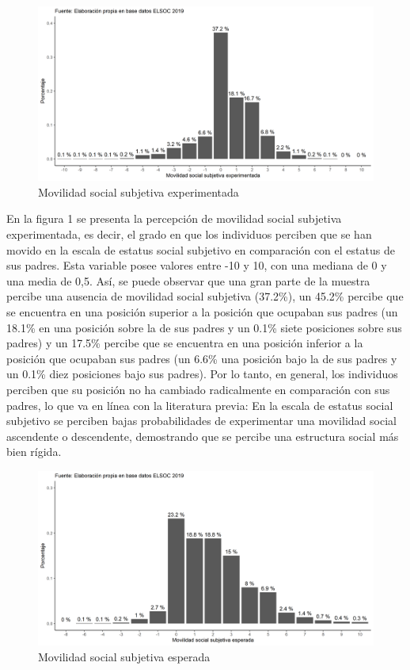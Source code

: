 \documentclass[
]{article}
\begin{document}
\begin{figure}

{\centering \includegraphics[width=0.8\linewidth,height=0.8\textheight]{output/graphs/graf1} 

}

\caption{Movilidad social subjetiva experimentada}\label{fig:unnamed-chunk-6}
\end{figure}

En la figura 1 se presenta la percepción de movilidad social subjetiva
experimentada, es decir, el grado en que los individuos perciben que se
han movido en la escala de estatus social subjetivo en comparación con
el estatus de sus padres. Esta variable posee valores entre -10 y 10,
con una mediana de 0 y una media de 0,5. Así, se puede observar que una
gran parte de la muestra percibe una ausencia de movilidad social
subjetiva (37.2\%), un 45.2\% percibe que se encuentra en una posición
superior a la posición que ocupaban sus padres (un 18.1\% en una
posición sobre la de sus padres y un 0.1\% siete posiciones sobre sus
padres) y un 17.5\% percibe que se encuentra en una posición inferior a
la posición que ocupaban sus padres (un 6.6\% una posición bajo la de
sus padres y un 0.1\% diez posiciones bajo sus padres). Por lo tanto, en
general, los individuos perciben que su posición no ha cambiado
radicalmente en comparación con sus padres, lo que va en línea con la
literatura previa: En la escala de estatus social subjetivo se perciben
bajas probabilidades de experimentar una movilidad social ascendente o
descendente, demostrando que se percibe una estructura social más bien
rígida.

\begin{figure}

{\centering \includegraphics[width=0.8\linewidth,height=0.8\textheight]{output/graphs/graf2} 

}

\caption{Movilidad social subjetiva esperada}\label{fig:unnamed-chunk-7}
\end{figure}
\end{document}

